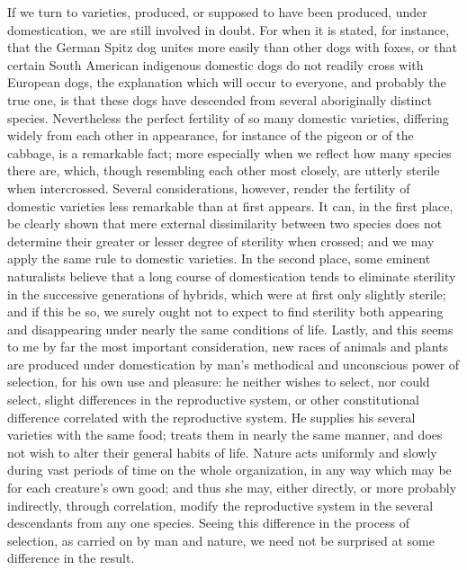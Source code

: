 \indent If we turn to varieties, produced, or supposed to have been produced, under domestication, we are still involved in doubt. For when it is stated, for instance, that the German Spitz dog unites more easily than other dogs with foxes, or that certain South American indigenous domestic dogs do not readily cross with European dogs, the explanation which will occur to everyone, and probably the true one, is that these dogs have descended from several aboriginally distinct species. Nevertheless the perfect fertility of so many domestic varieties, differing widely from each other in appearance, for instance of the pigeon or of the cabbage, is a remarkable fact; more especially when we reflect how many species there are, which, though resembling each other most closely, are utterly sterile when intercrossed. Several considerations, however, render the fertility of domestic varieties less remarkable than at first appears. It can, in the first place, be clearly shown that mere external dissimilarity between two species does not determine their greater or lesser degree of sterility when crossed; and we may apply the same rule to domestic varieties. In the second place, some eminent naturalists believe that a long course of domestication tends to eliminate sterility in the successive generations of hybrids, which were at first only slightly sterile; and if this be so, we surely ought not to expect to find sterility both appearing and disappearing under nearly the same conditions of life. Lastly, and this seems to me by far the most important consideration, new races of animals and plants are produced under domestication by man's methodical and unconscious power of selection, for his own use and pleasure: he neither wishes to select, nor could select, slight differences in the reproductive system, or other constitutional difference correlated with the reproductive system. He supplies his several varieties with the same food; treats them in nearly the same manner, and does not wish to alter their general habits of life. Nature acts uniformly and slowly during vast periods of time on the whole organization, in any way which may be for each creature's own good; and thus she may, either directly, or more probably indirectly, through correlation, modify the reproductive system in the several descendants from any one species. Seeing this difference in the process of selection, as carried on by man and nature, we need not be surprised at some difference in the result.\\
